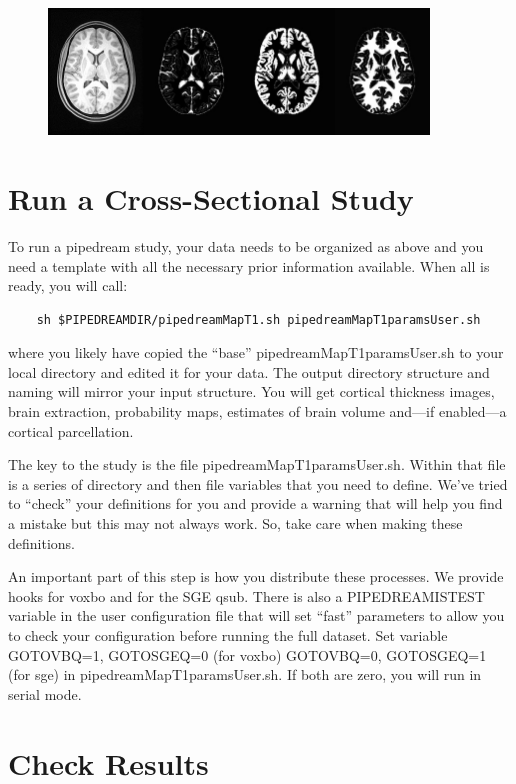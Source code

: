 \documentclass{InsightArticle}
\begin{document}
\begin{figure}
\includegraphics[width=0.9\textwidth]{figures/templatefig.jpg} 
\vspace{-0.1in}
\label{fig:template}
\end{figure}

\section{Run a Cross-Sectional Study}
To run a pipedream study, your data needs to be organized as above and you need a template 
with all the necessary prior information available.  When all is ready, you will call:
\begin{verbatim}
    sh $PIPEDREAMDIR/pipedreamMapT1.sh pipedreamMapT1paramsUser.sh 
\end{verbatim}
where you likely have copied the ``base'' pipedreamMapT1paramsUser.sh
to your local directory and edited it for your data.  The output
directory structure and naming will mirror your input structure.  You
will get cortical thickness images, brain extraction, probability
maps, estimates of brain volume and---if enabled---a cortical
parcellation.

The key to the study is the file pipedreamMapT1paramsUser.sh.  
Within that file is a series of directory and then file variables that you need to define.  
We've tried to ``check'' your definitions for you and provide a warning that will help you 
find a mistake but this may not always work.  So, take care when making these definitions.

An important part of this step is how you distribute these processes.
We provide hooks for voxbo and for the SGE qsub.  There is also a
PIPEDREAMISTEST variable in the user configuration file that will set
``fast'' parameters to allow you to check your configuration before
running the full dataset.  Set variable GOTOVBQ=1, GOTOSGEQ=0 (for
voxbo) GOTOVBQ=0, GOTOSGEQ=1 (for sge) in pipedreamMapT1paramsUser.sh.  
If both are zero, you will run in serial mode. 

\section{Check Results}
\end{document}
